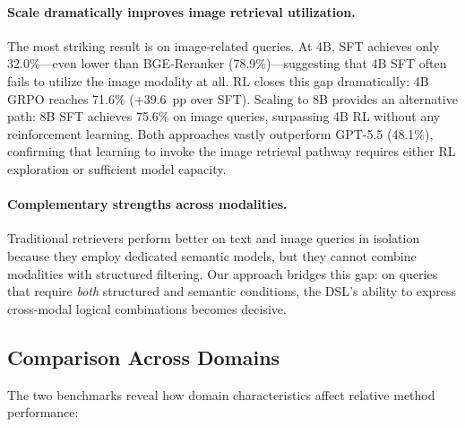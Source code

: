 \documentclass[11pt]{article}
\begin{document}
\paragraph{Scale dramatically improves image retrieval utilization.}
The most striking result is on image-related queries. At 4B, SFT achieves only 32.0\%---even lower than BGE-Reranker (78.9\%)---suggesting that 4B SFT often fails to utilize the image modality at all. RL closes this gap dramatically: 4B GRPO reaches 71.6\% (+39.6~pp over SFT). Scaling to 8B provides an alternative path: 8B SFT achieves 75.6\% on image queries, surpassing 4B RL without any reinforcement learning. Both approaches vastly outperform GPT-5.5 (48.1\%), confirming that learning to invoke the image retrieval pathway requires either RL exploration or sufficient model capacity.

\paragraph{Complementary strengths across modalities.}
Traditional retrievers perform better on text and image queries in isolation because they employ dedicated semantic models, but they cannot combine modalities with structured filtering. Our approach bridges this gap: on queries that require \emph{both} structured and semantic conditions, the DSL's ability to express cross-modal logical combinations becomes decisive.


\subsection{Comparison Across Domains}
\label{sec:cross_domain}

The two benchmarks reveal how domain characteristics affect relative method performance:
\end{document}
